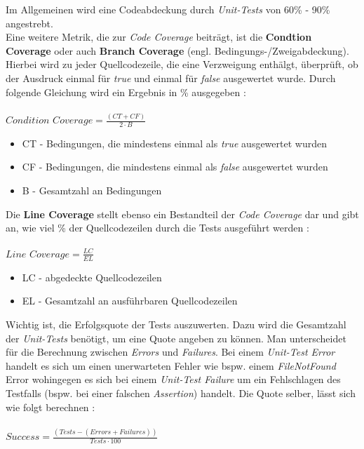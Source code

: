Im Allgemeinen wird eine Codeabdeckung durch \textit{Unit-Tests} von 60\% - 90\% angestrebt. \cite*{WhatReasonableCode}\\
Eine weitere Metrik, die zur \textit{Code Coverage} beiträgt, ist die \textbf{Condtion Coverage} oder auch \textbf{Branch Coverage} (engl. Bedingungs-/Zweigabdeckung). Hierbei wird zu jeder Quellcodezeile, die eine Verzweigung enthälgt, überprüft, ob der Ausdruck einmal für \textit{true} und einmal für \textit{false} ausgewertet wurde. Durch folgende Gleichung wird ein Ergebnis in \% ausgegeben \cite*{MetricDefinition}:\\\\
$Condition \,\, Coverage = \frac{(CT + CF)}{2 \cdot B}$
\begin{itemize}
    \setlength{\parskip}{1pt}
    \item CT - Bedingungen, die mindestens einmal als \textit{true} ausgewertet wurden
    \item CF - Bedingungen, die mindestens einmal als \textit{false} ausgewertet wurden
    \item B - Gesamtzahl an Bedingungen
\end{itemize}
Die \textbf{Line Coverage} stellt ebenso ein Bestandteil der \textit{Code Coverage} dar und gibt an, wie viel \% der Quellcodezeilen durch die Tests ausgeführt werden \cite*{MetricDefinition}:\\\\
$Line \,\, Coverage = \frac{LC}{EL}$
\begin{itemize}
    \setlength{\parskip}{1pt}
    \item LC - abgedeckte Quellcodezeilen
    \item EL - Gesamtzahl an ausführbaren Quellcodezeilen
\end{itemize}
Wichtig ist, die Erfolgsquote der Tests auszuwerten. Dazu wird die Gesamtzahl der \textit{Unit-Tests} benötigt, um eine Quote angeben zu können. Man unterscheidet für die Berechnung zwischen \textit{Errors} und \textit{Failures}. Bei einem \textit{Unit-Test Error} handelt es sich um einen unerwarteten Fehler wie bspw. einem \textit{FileNotFound} Error wohingegen es sich bei einem \textit{Unit-Test Failure} um ein Fehlschlagen des Testfalls (bspw. bei einer falschen \textit{Assertion}) handelt. Die Quote selber, lässt sich wie folgt berechnen \cite*{MetricDefinition}:\\\\
$Success = \frac{(Tests - (Errors + Failures))}{Tests \cdot 100}$\\\\
